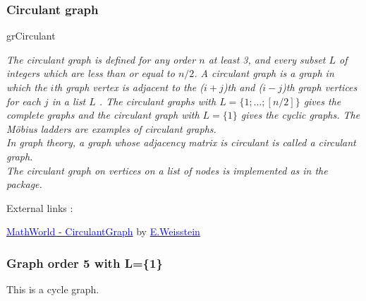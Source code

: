 \subsubsection{Circulant graph}
\begin{NewMacroBox}{grCirculant}{}

\medskip
\emph{The circulant graph  is defined for any order $n$ at least 3, and every subset $L$ of integers which are less than or equal to $n/2$.  A circulant graph is a graph  in which the $i$th graph vertex is adjacent to the ($i+j$)th and ($i-j$)th graph vertices for each $j$ in a list $L$ . The circulant graphs with $L=\{1;\dots;[n/2]\}$  gives the complete graphs  and the circulant graph with $L=\{1\}$  gives the cyclic graphs. The Möbius ladders are examples of circulant graphs.\\
 In graph theory, a graph  whose adjacency matrix is circulant is called a circulant graph.\\
The circulant graph on  vertices on a list of nodes  is implemented as  in the  package.}

\medskip
External links :

\href{http://mathworld.wolfram.com/CirculantGraph.html}%
           {\textcolor{blue}{MathWorld - CirculantGraph}} by %
      \href{http://en.wikipedia.org/wiki/Eric_W._Weisstein}%
           {\textcolor{blue}{E.Weisstein}}
\end{NewMacroBox}

\SetUpEdge[style = {thick,%
                    double          = orange,%
                    double distance = 1pt}]

\SetVertexNoLabel
{}

\subsubsection{Graph  order 5 with L=\{1\}}

This is a cycle graph.

\begin{center}
\begin{tkzexample}[vbox]
\end{tkzexample}
\end{center}

